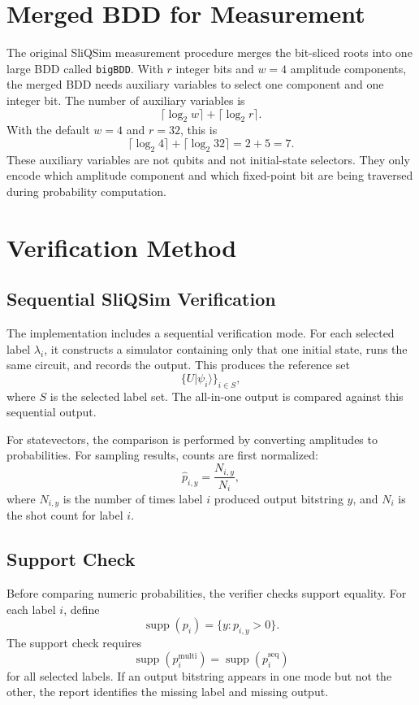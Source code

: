 \documentclass[sigconf,nonacm]{acmart}
\begin{document}
\section{Merged BDD for Measurement}
The original SliQSim measurement procedure merges the bit-sliced roots into one large BDD called \texttt{bigBDD}. With $r$ integer bits and $w=4$ amplitude components, the merged BDD needs auxiliary variables to select one component and one integer bit. The number of auxiliary variables is
\[
  \lceil\log_2 w\rceil+\lceil\log_2 r\rceil.
\]
With the default $w=4$ and $r=32$, this is
\[
  \lceil\log_2 4\rceil+\lceil\log_2 32\rceil=2+5=7.
\]
These auxiliary variables are not qubits and not initial-state selectors. They only encode which amplitude component and which fixed-point bit are being traversed during probability computation.

\section{Verification Method}
\subsection{Sequential SliQSim Verification}
The implementation includes a sequential verification mode. For each selected label $\lambda_i$, it constructs a simulator containing only that one initial state, runs the same circuit, and records the output. This produces the reference set
\[
  \{U\lvert\psi_i\rangle\}_{i\in S},
\]
where $S$ is the selected label set. The all-in-one output is compared against this sequential output.

For statevectors, the comparison is performed by converting amplitudes to probabilities. For sampling results, counts are first normalized:
\[
  \widehat{p}_{i,y}=\frac{N_{i,y}}{N_i},
\]
where $N_{i,y}$ is the number of times label $i$ produced output bitstring $y$, and $N_i$ is the shot count for label $i$.

\subsection{Support Check}
Before comparing numeric probabilities, the verifier checks support equality. For each label $i$, define
\[
  \operatorname{supp}(p_i)=\{y:p_{i,y}>0\}.
\]
The support check requires
\[
  \operatorname{supp}(p_i^{\mathrm{multi}})
  =
  \operatorname{supp}(p_i^{\mathrm{seq}})
\]
for all selected labels. If an output bitstring appears in one mode but not the other, the report identifies the missing label and missing output.
\end{document}

